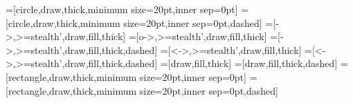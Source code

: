 \newcommand{\Exp}{\mathbb{E}}
\newcommand{\Cov}{\mathbb{C}\mathrm{ov}}
\newcommand{\Vaf}{\mathbb{V}\mathrm{ar}}
\newcommand{\dbtilde}[1]{\accentset{\approx}{#1}}

=[circle,draw,thick,minimum size=20pt,inner sep=0pt]
=[circle,draw,thick,minimum size=20pt,inner sep=0pt,dashed] %
=[->,>=stealth',draw,fill,thick]
=[o->,>=stealth',draw,fill,thick]
=[->,>=stealth',draw,fill,thick,dashed] %
=[<->,>=stealth',draw,fill,thick]
=[<->,>=stealth',draw,fill,thick,dashed] %
=[draw,fill,thick]
=[draw,fill,thick,dashed] %
=[rectangle,draw,thick,minimum size=20pt,inner sep=0pt]
=[rectangle,draw,thick,minimum size=20pt,inner sep=0pt,dashed]

\newcommand\IM{\mathrm{IM}}
\newcommand\CIM{\mathrm{CIM}}
\newcommand{\MAG}{\mathrm{MAG_\sigma}}
\newcommand{\PAG}{\mathrm{PAG}}
\newcommand{\DMAG}{\mathrm{DMAG}}
\newcommand{\DPAG}{\mathrm{DPAG}}
\newcommand{\CDPAG}{\mathrm{CDPAG}}
\newcommand{\sepset}{\mathtt{sepset}}
\newcommand{\separable}{\mathtt{separable}}
\newcommand{\FCI}{\mathtt{FCI}}
\newcommand{\SEP}{\mathtt{SEP}}
\newcommand{\PosSEP}{\mathtt{possibleSEP}}

\newcommand{\lt}{\lp} %
\newcommand{\rt}{\rp} %
\newcommand{\ltuple}{(}
\newcommand{\rtuple}{)}
